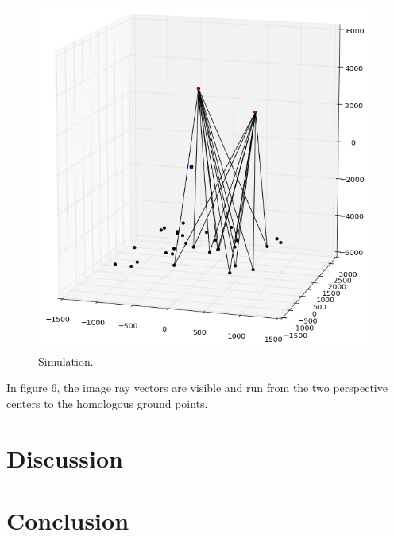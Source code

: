 \documentclass{article}
\begin{document}
\begin{figure}[h!]
	\centering
	\caption{Simulation.}
	\includegraphics[scale=0.3]{vectors}
\end{figure}
In figure 6, the image ray vectors are visible and run from the two perspective centers to the homologous ground points.


\section{Discussion}

\section{Conclusion}
\end{document}
